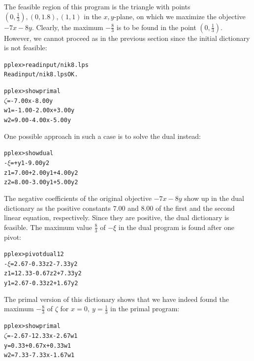 \documentclass[ukenglish]{nik}
\begin{document}
The feasible region of this program is the
triangle with points $(0,\frac{1}{3}),(0,1.8),(1,1)$
in the $x,y$-plane, on which we maximize the objective $-7x-8y$.
Clearly, the maximum $-\frac{8}{3}$ is to be found in the point $(0,\frac{1}{3})$.
However, we cannot proceed as in the previous section since the
initial dictionary is not feasible:
\begin{alltt}
pplex> read input/nik8.lps
Read input/nik8.lps OK.

pplex> show primal
 \(\zeta\) =        - 7.00x - 8.00y
w1 = - 1.00 - 2.00x + 3.00y
w2 =   9.00 - 4.00x - 5.00y
\end{alltt}
One possible approach in such a case is to solve the dual instead:
\begin{alltt}
pplex> show dual
-\(\xi\) =      +     y1 - 9.00y2
z1 = 7.00 + 2.00y1 + 4.00y2
z2 = 8.00 - 3.00y1 + 5.00y2
\end{alltt}
The negative coefficients of the original objective $-7x-8y$ show up in the dual
dictionary as the positive constants $7.00$ and $8.00$ of the first and the second 
linear equation, respectively. Since they are positive, the dual dictionary is feasible.
The maximum value $\frac{8}{3}$ of \(-\xi\) in the dual program is found after one pivot:
\begin{alltt}
pplex> pivot dual 1 2
-\(\xi\) =  2.67 - 0.33z2 - 7.33y2
z1 = 12.33 - 0.67z2 + 7.33y2
y1 =  2.67 - 0.33z2 + 1.67y2
\end{alltt}
The primal version of this dictionary shows that we have indeed found the
maximum $-\frac{8}{3}$ of $\zeta$ for $x=0,~y=\frac{1}{3}$ in the primal program:
\begin{alltt}
pplex> show primal
 \(\zeta\) = - 2.67 - 12.33x - 2.67w1
 y =   0.33 +  0.67x + 0.33w1
w2 =   7.33 -  7.33x - 1.67w1
\end{alltt}
\end{document}
